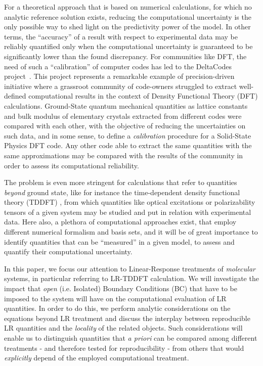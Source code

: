 \documentclass[reprint,aps,prb]{revtex4-1}
\begin{document}
For a theoretical approach that is based on numerical calculations, for which no analytic reference solution exists,
reducing the computational uncertainty is the only possible way to shed light on the predictivity power of the
model. In other terms, the ``accuracy'' of a result with respect to experimental data may be reliably quantified
only when the computational uncertainty is guaranteed to be significantly lower than the found discrepancy.
For communities like DFT, the need of such a ``calibration'' of computer codes has led to the DeltaCodes project~\cite{deltaTest2016}. 
This project represents a remarkable example of precision-driven initiative where a grassroot community of code-owners struggled to extract 
well-defined computational results in the context of Density Functional Theory (DFT) calculations. Ground-State quantum mechanical quantities 
as lattice constants and bulk modulus of elementary crystals extracted from different codes were compared with each other, with the objective of reducing the uncertainties on such data, and in some sense, to define a \emph{calibration} procedure for a Solid-State Physics DFT code.
Any other code able to extract the same quantities with the same approximations may be compared with the
results of the community in order to assess its computational reliability.


The problem is even more stringent for calculations that refer to quantities \emph{beyond} ground state, like
for instance the time-dependent density functional theory (TDDFT) \cite{casida1995,runge1984,onida2002},
from which quantities like optical excitations or polarizability tensors
of a given system may be studied and put in relation with experimental data.
Here also, a plethora of computational approaches exist, that employ different numerical formalism and
basis sets, and it will be of great importance to identify quantities that can be ``measured'' in a given model, to assess
and quantify their computational uncertainty.

In this paper, we focus our attention to Linear-Response treatments of \emph{molecular} systems,
in particular referring to LR-TDDFT calculation. We will investigate the impact that
\emph{open} (i.e. Isolated) Boundary Conditions (BC) that have to be imposed to the system will have on the computational evaluation of LR quantities.
In order to do this, we perform analytic considerations on the equations beyond LR treatment and discuss the interplay between reproducible LR quantities and the \emph{locality} of the related objects. Such considerations will enable us to distinguish quantities that \textit{a priori} can be compared among different treatments - and therefore tested for reproducibility - from others that would \emph{explicitly} depend of the employed computational treatment.
\end{document}
